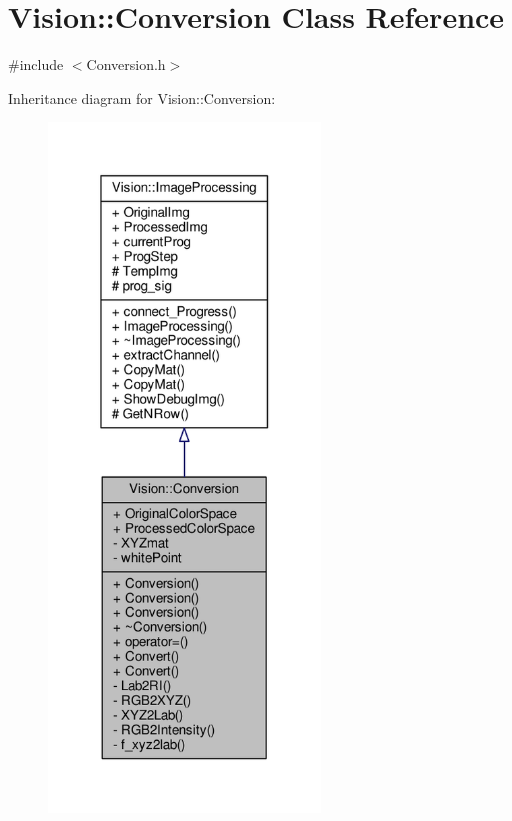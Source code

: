 \hypertarget{class_vision_1_1_conversion}{}\section{Vision\+:\+:Conversion Class Reference}
\label{class_vision_1_1_conversion}


{\ttfamily \#include $<$Conversion.\+h$>$}



Inheritance diagram for Vision\+:\+:Conversion\+:\nopagebreak
\begin{figure}[H]
\begin{center}
\leavevmode
\includegraphics[width=205pt]{class_vision_1_1_conversion__inherit__graph}
\end{center}
\end{figure}


